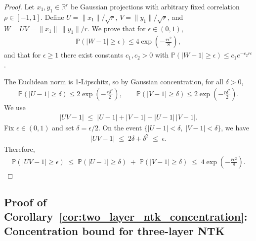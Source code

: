 \begin{proof}
Let \( x_1,y_1\in\mathbb{R}^r \) be Gaussian projections with arbitrary fixed correlation \( \rho\in[-1,1] \). Define \( U=\|x_1\|/\sqrt{r} \), \( V=\|y_1\|/\sqrt{r} \), and \( W=UV=\|x_1\|\,\|y_1\|/r \). We prove that for \( \epsilon\in(0,1) \),
\begin{align}
\mathbb{P}\!\left(\left|W-1\right|\ge \epsilon\right)\le 4\exp\!\left(-\frac{r\epsilon^2}{8}\right),
\end{align}
and that for \( \epsilon\ge 1 \) there exist constants \( c_1,c_2>0 \) with \( \mathbb{P}(|W-1|\ge \epsilon)\le c_1 e^{-c_2 r\epsilon} \).

The Euclidean norm is 1-Lipschitz, so by Gaussian concentration, for all \( \delta>0 \),
\begin{align}
\mathbb{P}\!\left(\left|U-1\right|\ge \delta\right)\le 2\exp\!\left(-\frac{r\delta^2}{2}\right),\qquad
\mathbb{P}\!\left(\left|V-1\right|\ge \delta\right)\le 2\exp\!\left(-\frac{r\delta^2}{2}\right).
\end{align}
We use
\begin{align}
|UV-1|\;\le\;|U-1|+|V-1|+|U-1|\,|V-1|.
\end{align}
Fix \( \epsilon\in(0,1) \) and set \( \delta=\epsilon/2 \). On the event \( \{|U-1|<\delta,\;|V-1|<\delta\} \), we have
\begin{align}
|UV-1|\;\le\;2\delta+\delta^2\;\le\; \epsilon.
\end{align}
Therefore,
\begin{align}
\mathbb{P}\!\left(|UV-1|\ge \epsilon\right)\;\le\; \mathbb{P}\!\left(|U-1|\ge \delta\right)\;+\;\mathbb{P}\!\left(|V-1|\ge \delta\right) \;\le\;4\exp\!\left(-\frac{r\epsilon^2}{8}\right).
\end{align}
\end{proof}

\subsection{Proof of Corollary~\ref{cor:two_layer_ntk_concentration}: Concentration bound for three-layer NTK}
\label{appendix:proof-three-layer-ntk-concentration}

